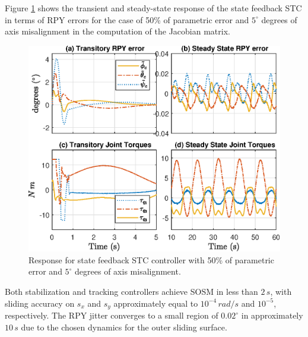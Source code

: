 Figure \ref{fig:CDC_result1} shows the transient and steady-state response of the state feedback STC in terms of RPY errors for the case of 50\% of parametric error and $5^\circ$ degrees of axis misalignment in the computation of the Jacobian matrix. 
%
\begin{figure}[!htpb]
\centering
\includegraphics[width=1.0\columnwidth]{results/CDC_result1}
\caption{Response for state feedback STC controller with 50\% of parametric error and $5^\circ$ degrees of axis misalignment.}
\label{fig:CDC_result1}
\end{figure}
%
Both stabilization and tracking controllers achieve SOSM in less than $2\,s$, with sliding accuracy on $s_x$ and $s_y$ approximately equal to $10^{-4} \, rad/s$ and $10^{-5}$, respectively.
%
The RPY jitter converges to a small region of $0.02^{\circ}$ in approximately $10\,s$ due to the chosen dynamics for the outer sliding surface.


